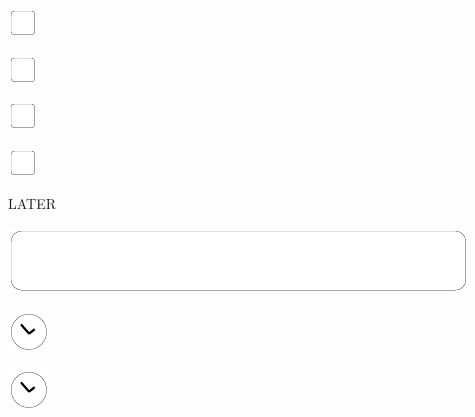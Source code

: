 \documentclass[11pt,titlepage]{article}
\begin{document}
\vspace{10mm}

\noindent
\includegraphics[]{checkbox-4mm.pdf}

\vspace{10mm}

\noindent
\includegraphics[]{checkbox-4mm.pdf}

\vspace{10mm}

\noindent
\includegraphics[]{checkbox-4mm.pdf}

\vspace{10mm}

\noindent
\includegraphics[]{checkbox-4mm.pdf}

\pagebreak

\small %
\hfill LATER

\vspace{6mm}

\noindent
\includegraphics[]{mediumbox.pdf}

\vspace{15mm}

\noindent
\hspace{1mm}\includegraphics[]{clockface.pdf}

\vspace{10,5mm}

\noindent
\hspace{1mm}\includegraphics[]{clockface.pdf}
\end{document}
